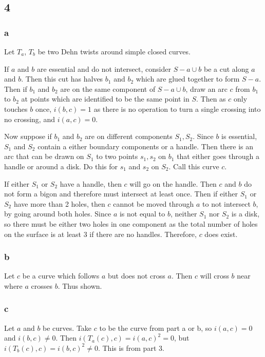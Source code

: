 \documentclass{article}
\theoremstyle{definition}
\numberwithin{theorem}{section}
\numberwithin{equation}{section}
\begin{document}
\subsection{4}
\subsubsection{a}

Let $T_a$, $T_b$ be two Dehn twists around simple closed curves.

If $a$ and $b$ are essential and do not intersect, consider $S - a \cup b$ be a cut along $a$ and $b$. Then this cut has halves $b_1$ and $b_2$ which are glued together to form $S - a$. Then if $b_1$ and $b_2$ are on the same component of $S - a \cup b$, draw an arc $c$ from $b_1$ to $b_2$ at points which are identified to be the same point in $S$. Then as $c$ only touches $b$ once, $i(b, c) = 1$ as there is no operation to turn a single crossing into no crossing, and $i(a, c) = 0$. 

Now suppose if $b_1$ and $b_2$ are on different components $S_1, S_2$. Since $b$ is essential, $S_1$ and $S_2$ contain a either boundary components or a handle. Then there is an arc that can be drawn on $S_1$ to two points $s_1, s_2$ on $b_1$ that either goes through a handle or around a disk. Do this for $s_1$ and $s_2$ on $S_2$. Call this curve $c$.

If either $S_1$ or $S_2$ have a handle, then $c$ will go on the handle. Then $c$ and $b$ do not form a bigon and therefore must intersect at least once. Then if either $S_1$ or $S_2$ have more than 2 holes, then $c$ cannot be moved through $a$ to not intersect $b$, by going around both holes. Since $a$ is not equal to $b$, neither $S_1$ nor $S_2$ is a disk, so there must be either two holes in one component as the total number of holes on the surface is at least 3 if there are no handles. Therefore, $c$ does exist. 
\subsubsection{b}
Let $c$ be a curve which follows $a$ but does not cross $a$. Then $c$ will cross $b$ near where $a$ crosses $b$. Thus shown. 

\subsubsection{c}
Let $a$ and $b$ be curves. Take $c$ to be the curve from part a or b, so $i(a, c) = 0$ and $i(b, c) \neq 0$. Then $i(T_a(c), c) = i(a, c)^2 = 0$, but $i(T_b(c), c) = i(b, c)^2 \neq 0$. This is from part 3. 
\end{document}
